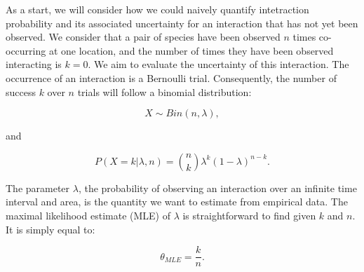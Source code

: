 \documentclass[12pt]{article}
\begin{document}
  As a start, we will consider how we could naively quantify intetraction probability and its associated uncertainty for an interaction that has not yet been observed. We consider that a pair of species have been observed $n$ times co-occurring at one location, and the number of times they have been observed interacting is $k = 0$. We aim to evaluate the uncertainty of this interaction. The occurrence of an interaction is a Bernoulli trial. Consequently, the number of success $k$ over $n$ trials will follow a binomial distribution: 
      
      \begin{equation}
        X \sim Bin(n,\lambda) ,
      \end{equation}

      \noindent and 

      \begin{equation}
         P(X = k|\lambda,n) = {n \choose k}\lambda^k(1-\lambda)^{n-k} . 
         \label{likelihood}
      \end{equation}

  \noindent The parameter $\lambda$, the probability of observing an interaction over an infinite time interval and area, is the quantity we want to estimate from empirical data. 
  The maximal likelihood estimate (MLE) of $\lambda$ is straightforward to find given $k$ and $n$. It is simply equal to:

      \begin{equation}
        \theta_{MLE} = \frac{k}{n}  .
        \label{theta_MLE}
      \end{equation}
\end{document}
